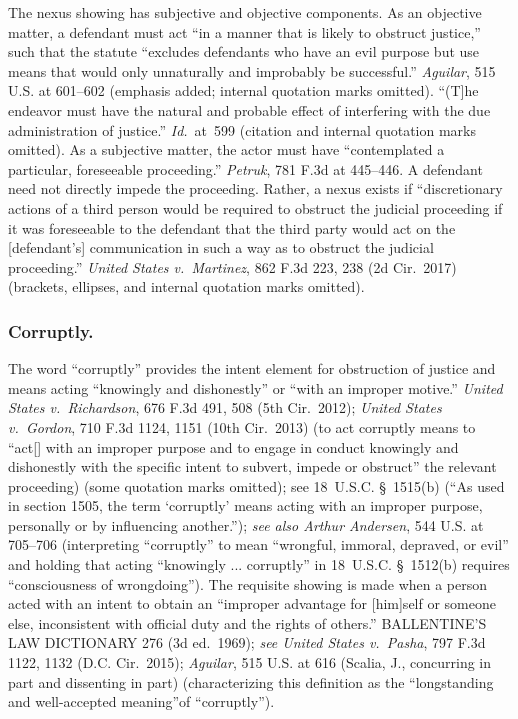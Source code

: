 The nexus showing has subjective and objective components.
As an objective matter, a defendant must act “in a manner that is likely to obstruct justice,” such that the statute “excludes defendants who have an evil purpose but use means that would only unnaturally and improbably be successful.”
\textit{Aguilar}, 515 U.S. at 601--602 (emphasis added; internal quotation marks omitted).
“(T]he endeavor must have the natural and probable effect of interfering with the due administration of justice.”
\textit{Id.}~at~599 (citation and internal quotation marks omitted).
As a subjective matter, the actor must have “contemplated a particular, foreseeable proceeding.”
\textit{Petruk}, 781 F.3d at 445--446.
A defendant need not directly impede the proceeding.
Rather, a nexus exists if “discretionary actions of a third person would be required to obstruct the judicial proceeding if it was foreseeable to the defendant that the third party would act on the [defendant’s] communication in such a way as to obstruct the judicial proceeding.”
\textit{United States v.\ Martinez}, 862 F.3d 223, 238 (2d Cir.~2017) (brackets, ellipses, and internal quotation marks omitted).

\subsubsection*{Corruptly.}

The word “corruptly” provides the intent element for obstruction of justice and means acting “knowingly and dishonestly” or “with an improper motive.”
\textit{United States v.\ Richardson}, 676 F.3d 491, 508 (5th Cir.~2012);
\textit{United States v.\ Gordon}, 710 F.3d 1124, 1151 (10th Cir.~2013) (to act corruptly means to “act[] with an improper purpose and to engage in conduct knowingly and dishonestly with the specific intent to subvert, impede or obstruct” the relevant proceeding) (some quotation marks omitted);
see 18~U.S.C. \S~1515(b) (“As used in section 1505, the term ‘corruptly’ means acting with an improper purpose, personally or by influencing another.”);
\textit{see also Arthur Andersen}, 544 U.S. at 705--706 (interpreting “corruptly” to mean “wrongful, immoral, depraved, or evil” and holding that acting “knowingly ... corruptly” in 18~U.S.C. \S~1512(b) requires “consciousness of wrongdoing”).
The requisite showing is made when a person acted with an intent to obtain an “improper advantage for [him]self or someone else, inconsistent with official duty and the rights of others.”
BALLENTINE’S LAW DICTIONARY 276 (3d ed.~1969);
\textit{see United States v.\ Pasha}, 797 F.3d 1122, 1132 (D.C. Cir.~2015);
\textit{Aguilar}, 515 U.S. at 616 (Scalia, J., concurring in part and dissenting in part) (characterizing this definition as the “longstanding and well-accepted meaning”of “corruptly”).

